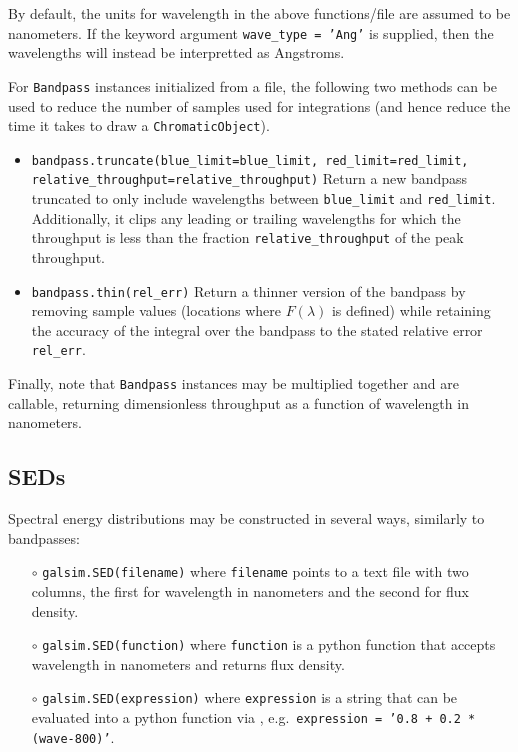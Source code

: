 \documentclass[preprint,11pt]{../../devel/modules/aastex}
\begin{document}
By default, the units for wavelength in the above functions/file are assumed to be nanometers.  If
the keyword argument \texttt{wave\_type = 'Ang'} is supplied, then the wavelengths will instead be
interpretted as Angstroms.

For \texttt{Bandpass} instances initialized from a file, the following two methods can be used to
reduce the number of samples used for integrations (and hence reduce the time it takes to draw
a \texttt{ChromaticObject}).
\begin{itemize}
\item {\tt bandpass.truncate(blue\_limit=blue\_limit, red\_limit=red\_limit, \newline
                             \phantom{bandpass.truncate(}relative\_throughput=relative\_throughput)}\newline
  Return a new bandpass truncated to only include wavelengths between \texttt{blue\_limit} and \texttt{red\_limit}.
  Additionally, it clips any leading or trailing wavelengths for which the throughput is less than
  the fraction \texttt{relative\_throughput} of the peak throughput.
\item {\tt bandpass.thin(rel\_err)}\newline
 Return a thinner version of the bandpass by removing sample values (locations where $F(\lambda)$ is defined) while retaining the
accuracy of the integral over the bandpass to the stated relative error \texttt{rel\_err}.
\end{itemize}

Finally, note that \texttt{Bandpass} instances may be multiplied
together and are callable, returning dimensionless throughput as a
function of wavelength in nanometers.

\subsection{SEDs}
Spectral energy distributions may be constructed in several ways, similarly to bandpasses:
\begin{itemize}
\item[$\circ$] {\tt galsim.SED(filename)} \newline where \texttt{filename} points to a
  text file with two columns, the first for wavelength in nanometers and the second for flux
  density.
\item[$\circ$] {\tt galsim.SED(function)} \newline where \texttt{function} is a python
  function that accepts wavelength in nanometers and returns flux density.
\item[$\circ$] {\tt galsim.SED(expression)} \newline where \texttt{expression} is a string
  that can be evaluated into a python function via ,
  \newline e.g.\ {\tt expression = '0.8 + 0.2 * (wave-800)'}.
\end{itemize}
\end{document}
